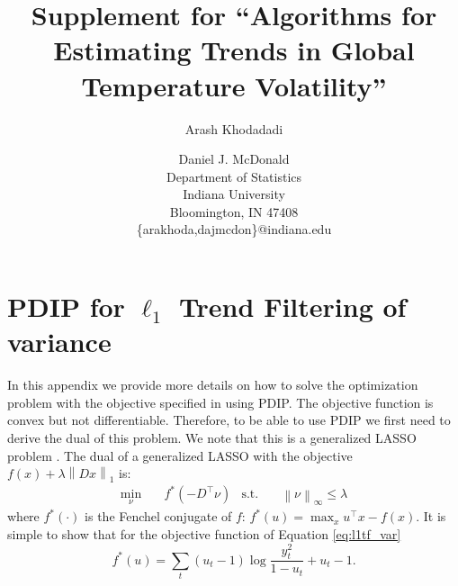 \documentclass[letterpaper]{article} %
\newcommand{\citep}{\cite}
\newcommand{\autoref}{\Cref}
\newcommand{\norm}[1]{\left\lVert #1 \right\rVert}
\begin{document}
 

\title{Supplement for ``Algorithms for Estimating Trends in Global Temperature Volatility''}

\author{Arash Khodadadi \and Daniel J. McDonald\\
 Department of Statistics\\
 Indiana University\\
 Bloomington, IN 47408 \\
 \{arakhoda,dajmcdon\}@indiana.edu}






\maketitle


\appendix
\section{PDIP for $\ell_1$ Trend Filtering of variance}
\label{sec:app_l1tf_var}

In this appendix we provide more details on how to solve the optimization problem with the objective specified in \autoref{eq:l1tf_var} using PDIP. The objective function is convex but not differentiable. Therefore, to be able to use PDIP we first need to derive the dual of this problem. We note that this is a generalized LASSO problem \citep{TibshiraniTaylor2011}. The dual of a generalized LASSO with the objective $f(x)+\lambda \norm{ Dx }_1$ is:  
\begin{align}
\min_\nu&\quad f^*(-D^\top\nu) & \mbox{s.t.}&\quad \norm{ \nu }_\infty \le \lambda
\end{align}
where $f^*(\cdot)$ is the Fenchel conjugate of $f$: $f^*(u)=\max_x u^\top x-f(x)$. It is simple to show that for the objective function of Equation \ref{eq:l1tf_var}
\begin{equation}
f^*(u)=\sum_t (u_t-1)\log\frac{y_t^2}{1-u_t} + u_t-1.
\label{eq:conj}
\end{equation}
\end{document}
